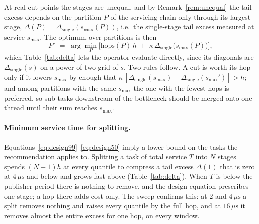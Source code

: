 \documentclass[11pt]{article}
\begin{document}
At real cut points the stages are unequal, and by Remark~\ref{rem:unequal} the tail excess
depends on the partition $P$ of the servicing chain only through its largest stage,
$\Delta(P) = \Delta_{\mathrm{single}}(s_{\max}(P))$, i.e.\ the single-stage tail excess
measured at service $s_{\max}$. The optimum over partitions is then
\[
P^\star \;=\; \arg\min_P \Big[ \mathrm{hops}(P)\, h \;+\; \kappa\,
\Delta_{\mathrm{single}}\big(s_{\max}(P)\big) \Big],
\]
which Table~\ref{tab:delta} lets the operator evaluate directly, since its diagonals are
$\Delta_{\mathrm{single}}(s)$ on a power-of-two grid of $s$. Two rules follow.
A cut is worth its hop only if it lowers $s_{\max}$ by enough that
$\kappa\,[\Delta_{\mathrm{single}}(s_{\max}) - \Delta_{\mathrm{single}}(s_{\max}')] > h$;
and among partitions with the same $s_{\max}$ the one with the fewest hops is preferred,
so sub-tasks downstream of the bottleneck should be merged onto one thread until their sum
reaches $s_{\max}$.

\begin{center}
\end{center}

\paragraph{Minimum service time for splitting.}
Equations~\eqref{eq:design99}--\eqref{eq:design50} imply a lower bound on the tasks the
recommendation applies to. Splitting a task of total service $T$ into $N$ stages spends
$(N-1)h$ at every quantile to compress a tail excess $\Delta(1)$ that is zero at
$4\,\mu\mathrm{s}$ and below and grows fast above (Table~\ref{tab:delta}). When $T$ is
below the publisher period there is nothing to remove, and the design equation
prescribes one stage; a hop there adds cost only. The sweep confirms this: at $2$ and
$4\,\mu\mathrm{s}$ a split removes nothing and raises every quantile by the full hop, and at
$16\,\mu\mathrm{s}$ it removes almost the entire excess for one hop, on every window.
\end{document}
